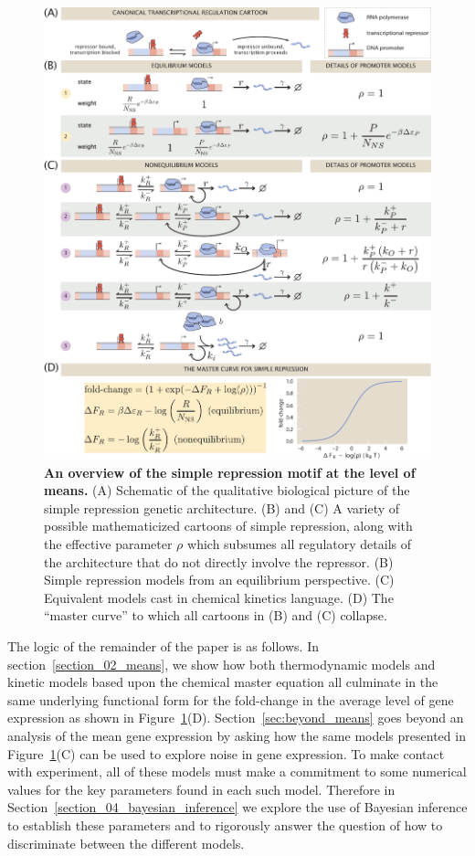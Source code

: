 \afterpage{\clearpage}
\begin{figure}[p]
\centering
\includegraphics[width=\textwidth]{../figures/main/fig01.pdf}
\caption{\textbf{An overview of the simple repression motif at the level of
means.} (A) Schematic of the qualitative biological picture of the simple
repression genetic architecture. (B) and (C) A variety of possible
mathematicized cartoons of simple repression, along with the effective parameter
$\rho$ which subsumes all regulatory details of the architecture that do not
directly involve the repressor. (B) Simple repression models from an equilibrium
perspective. (C) Equivalent models cast in chemical kinetics language. (D) The
``master curve'' to which all cartoons in (B) and (C) collapse.}
\label{fig1:means_cartoons}
\end{figure}

The logic of the remainder of the paper is as follows. In
section~\ref{section_02_means}, we show how both thermodynamic models and
kinetic models based upon the chemical master equation all culminate in the same
underlying functional form for the fold-change in the average level of gene
expression as shown in Figure~\ref{fig1:means_cartoons}(D).
Section~\ref{sec:beyond_means} goes beyond an analysis of the mean
gene expression by asking how the same models presented in
Figure~\ref{fig1:means_cartoons}(C) can be used to explore noise in gene
expression. To make contact with experiment, all of these models must make a
commitment to some numerical values for the key parameters found in each such
model. Therefore in Section~\ref{section_04_bayesian_inference} we explore
the use of Bayesian inference to establish these parameters and to rigorously
answer the question of how to discriminate between the different models.

